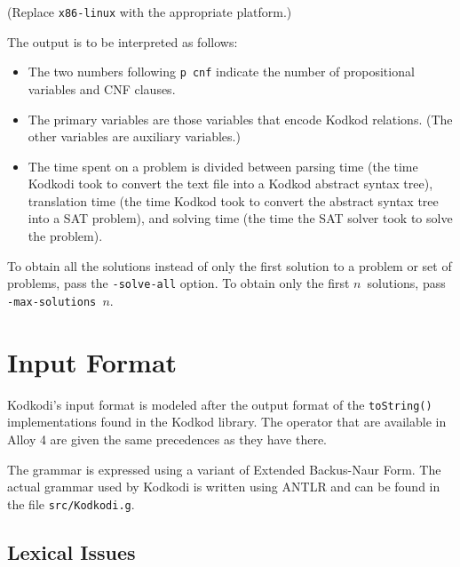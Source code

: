 \documentclass[a4paper,12pt]{article}
\begin{document}
(Replace \texttt{x86-linux} with the appropriate platform.)

The output is to be interpreted as follows:
%
\begin{itemize}
\item The two numbers following \texttt{p~cnf} indicate the number of
propositional variables and CNF clauses.
\item The primary variables are those variables that encode Kodkod relations.
(The other variables are auxiliary variables.)
\item The time spent on a problem is divided between parsing time (the time
Kodkodi took to convert the text file into a Kodkod abstract syntax tree),
translation time (the time Kodkod took to convert the abstract syntax tree into
a SAT problem), and solving time (the time the SAT solver took to solve the
problem).
\end{itemize}
%
To obtain all the solutions instead of only the first solution to a problem or
set of problems, pass the \texttt{-solve-all} option. To obtain only the first
$n$~solutions, pass \texttt{-max-solutions~$n$}.

\section{Input Format}
\label{input-format}

Kodkodi's input format is modeled after the output format of the
\texttt{toString()} implementations found in the Kodkod library. The operator
that are available in Alloy 4 are given the same precedences as they have there.

The grammar is expressed using a variant of Extended Backus-Naur Form. The
actual grammar used by Kodkodi is written using ANTLR and can be found in the
file \texttt{src/Kodkodi.g}.

\subsection{Lexical Issues}
\label{lexical-issues}
\end{document}
